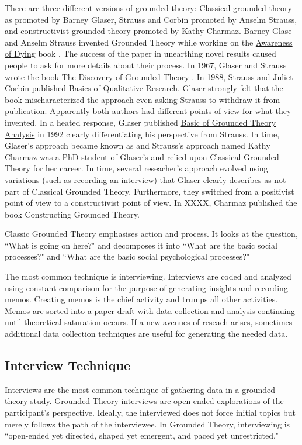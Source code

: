 There are three different versions of grounded theory: Classical grounded theory as promoted by Barney Glaser, Strauss and Corbin promoted by Anselm Strauss, and constructivist grounded theory promoted by Kathy Charmaz. Barney Glase and Anselm Strauss invented Grounded Theory while working on the \underline{Awareness of Dying} book \cite{GlaserAwarenessOfDying}. The success of the paper in unearthing novel results caused people to ask for more details about their process. In 1967, Glaser and Strauss wrote the book \underline{The Discovery of Grounded Theory} \cite{GlaserDiscovery}. In 1988, Strauss and Juliet Corbin published \underline{Basics of Qualitative Research}. Glaser strongly felt that the book mischaracterized the approach even asking Strauss to withdraw it from publication. Apparently both authors had different points of view for what they invented. In a heated response, Glaser published \underline{Basic of Grounded Theory Analysis} in 1992 clearly differentiating his perspective from Strauss. In time, Glaser’s approach became known as  and Strauss’s approach named  Kathy Charmaz was a PhD student of Glaser’s and relied upon Classical Grounded Theory for her career. In time, several reseacher’s approach evolved using variations (such as recording an interview) that Glaser clearly describes as not part of Classical Grounded Theory. Furthermore, they switched from a positivist point of view to a constructivist point of view. In XXXX, Charmaz published the book Constructing Grounded Theory. 

Classic Grounded Theory emphasises action and process. It looks at the question, ``What is going on here?" and decomposes it into ``What are the basic social processes?" and ``What are the basic social psychological processes?" 

The most common technique is interviewing. Interviews are coded and analyzed using constant comparison for the purpose of generating insights and recording memos. Creating memos is the chief activity and trumps all other activities. Memos are sorted into a paper draft with data collection and analysis continuing until theoretical saturation occurs. If a new avenues of reseach arises, sometimes additional data collection techniques are useful for generating the needed data. 
\subsection{Interview Technique}
Interviews are the most common technique of gathering data in a grounded theory study. Grounded Theory interviews are open-ended explorations of the participant’s perspective. Ideally, the interviewed does not force initial topics but merely follows the path of the interviewee. In Grounded Theory, interviewing is ``open-ended yet directed, shaped yet emergent, and paced yet unrestricted."

